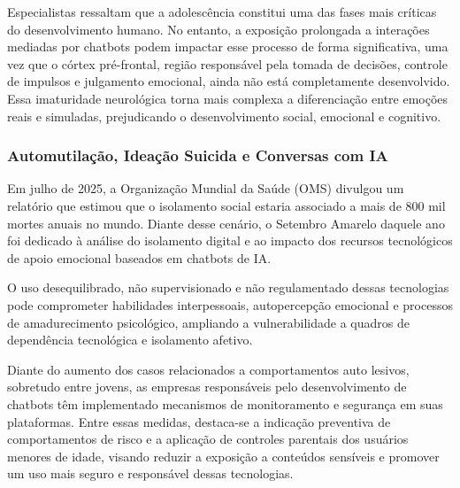 \documentclass[12pt]{article}
\begin{document}

	Especialistas ressaltam que a adolescência constitui uma das fases mais críticas do desenvolvimento humano. No entanto, a exposição prolongada a interações mediadas por chatbots podem impactar esse processo de forma significativa, uma vez que o córtex pré-frontal, região responsável pela tomada de decisões, controle de impulsos e julgamento emocional, ainda não está completamente desenvolvido. Essa imaturidade neurológica torna mais complexa a diferenciação entre emoções reais e simuladas, prejudicando o desenvolvimento social, emocional e cognitivo. \cite{divmagic2025}

\subsubsection{Automutilação, Ideação Suicida e Conversas com IA}

Em julho de 2025, a Organização Mundial da Saúde (OMS) divulgou um relatório que estimou que o isolamento social estaria associado a mais de 800 mil mortes anuais no mundo. Diante desse cenário, o Setembro Amarelo daquele ano foi dedicado à análise do isolamento digital e ao impacto dos recursos tecnológicos de apoio emocional baseados em chatbots de IA. \cite{gov2025}


	O uso desequilibrado, não supervisionado e não regulamentado dessas tecnologias pode comprometer habilidades interpessoais, autopercepção emocional e processos de amadurecimento psicológico, ampliando a vulnerabilidade a quadros de dependência tecnológica e isolamento afetivo. \cite{gov2025}

    Diante do aumento dos casos relacionados a comportamentos auto lesivos, sobretudo entre jovens, as empresas responsáveis pelo desenvolvimento de chatbots têm implementado mecanismos de monitoramento e segurança em suas plataformas. Entre essas medidas, destaca-se a indicação preventiva de comportamentos de risco e a aplicação de controles parentais dos usuários menores de idade, visando reduzir a exposição a conteúdos sensíveis e promover um uso mais seguro e responsável dessas tecnologias. \cite{g1Suc2025}
\end{document}
